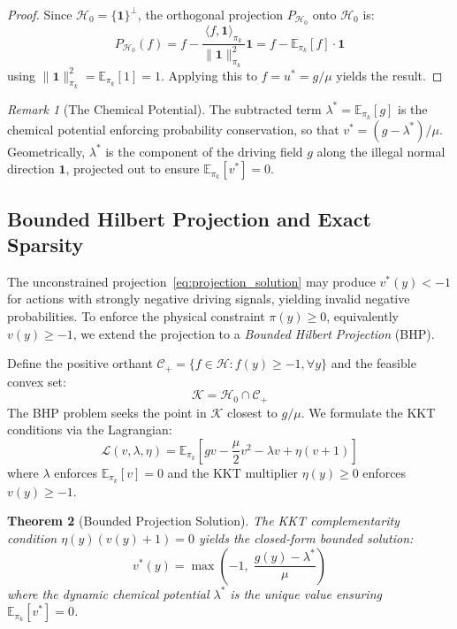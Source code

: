 \documentclass[11pt]{article}
\newtheorem{theorem}{Theorem}[section]
\theoremstyle{definition}
\theoremstyle{remark}
\newtheorem{remark}[theorem]{Remark}
\newcommand{\E}{\mathbb{E}}
\newcommand{\pik}{\pi_k}
\begin{document}
\begin{proof}
Since $\mathcal{H}_0 = \{\mathbf{1}\}^\perp$, the orthogonal projection $P_{\mathcal{H}_0}$ onto $\mathcal{H}_0$ is:
\begin{equation}
    P_{\mathcal{H}_0}(f) = f - \frac{\langle f, \mathbf{1} \rangle_{\pik}}{\|\mathbf{1}\|^2_{\pik}} \mathbf{1} = f - \E_{\pik}[f] \cdot \mathbf{1}
\end{equation}
using $\|\mathbf{1}\|^2_{\pik} = \E_{\pik}[1] = 1$. Applying this to $f = u^* = g/\mu$ yields the result.
\end{proof}

\begin{remark}[The Chemical Potential]
\label{rem:chemical_potential}
The subtracted term $\lambda^* = \E_{\pik}[g]$ is the chemical potential enforcing probability conservation, so that $v^* = (g - \lambda^*)/\mu$. Geometrically, $\lambda^*$ is the component of the driving field $g$ along the illegal normal direction $\mathbf{1}$, projected out to ensure $\E_{\pik}[v^*] = 0$.
\end{remark}

\subsection{Bounded Hilbert Projection and Exact Sparsity}
\label{subsec:bhp}

The unconstrained projection~\eqref{eq:projection_solution} may produce $v^*(y) < -1$ for actions with strongly negative driving signals, yielding invalid negative probabilities. To enforce the physical constraint $\pi(y) \geq 0$, equivalently $v(y) \geq -1$, we extend the projection to a \emph{Bounded Hilbert Projection} (BHP).

Define the positive orthant $\mathcal{C}_+ = \{f \in \mathcal{H} : f(y) \geq -1, \forall y\}$ and the feasible convex set:
\begin{equation}
    \mathcal{K} = \mathcal{H}_0 \cap \mathcal{C}_+
\end{equation}
The BHP problem seeks the point in $\mathcal{K}$ closest to $g/\mu$. We formulate the KKT conditions via the Lagrangian:
\begin{equation}
    \mathcal{L}(v, \lambda, \eta) = \E_{\pik}\!\left[ g v - \frac{\mu}{2}v^2 - \lambda v + \eta(v + 1) \right]
\end{equation}
where $\lambda$ enforces $\E_{\pik}[v] = 0$ and the KKT multiplier $\eta(y) \geq 0$ enforces $v(y) \geq -1$.

\begin{theorem}[Bounded Projection Solution]
\label{thm:bhp}
The KKT complementarity condition $\eta(y)(v(y) + 1) = 0$ yields the closed-form bounded solution:
\begin{equation}
\label{eq:bhp_solution}
    v^*(y) = \max\!\left(-1, \; \frac{g(y) - \lambda^*}{\mu}\right)
\end{equation}
where the dynamic chemical potential $\lambda^*$ is the unique value ensuring $\E_{\pik}[v^*] = 0$.
\end{theorem}
\end{document}
